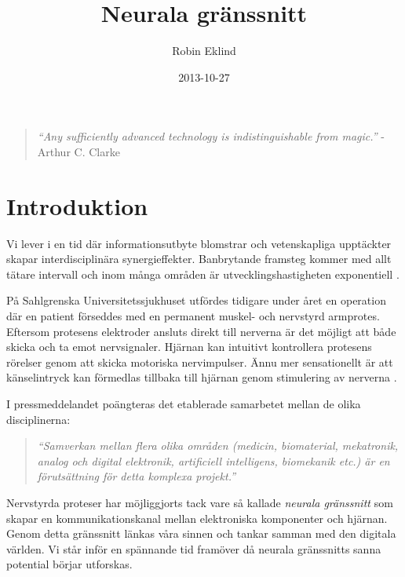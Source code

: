 \documentclass[12pt, a4paper]{article}
\title{Neurala gränssnitt}
\author{Robin Eklind}
\date{2013-10-27}
\begin{document}
\maketitle

\vfill

\begin{quote}
	\textit{``Any sufficiently advanced technology is indistinguishable from magic.''} - \\ Arthur C. Clarke \cite{clarke_quote}
\end{quote}

\pagebreak

\tableofcontents

\pagebreak


\section{Introduktion}

Vi lever i en tid där informationsutbyte blomstrar och vetenskapliga upptäckter skapar interdisciplinära synergieffekter. Banbrytande framsteg kommer med allt tätare intervall och inom många områden är utvecklingshastigheten exponentiell \cite{exponential}.

På Sahlgrenska Universitetssjukhuset utfördes tidigare under året en operation där en patient förseddes med en permanent muskel- och nervstyrd armprotes. Eftersom protesens elektroder ansluts direkt till nerverna är det möjligt att både skicka och ta emot nervsignaler. Hjärnan kan intuitivt kontrollera protesens rörelser genom att skicka motoriska nervimpulser. Ännu mer sensationellt är att känselintryck kan förmedlas tillbaka till hjärnan genom stimulering av nerverna \cite{prosthetic_operation}.

I pressmeddelandet poängteras det etablerade samarbetet mellan de olika disciplinerna:
\begin{quote}
	\textit{``Samverkan mellan flera olika områden (medicin, biomaterial, mekatronik, analog och digital elektronik, artificiell intelligens, biomekanik etc.) är en förutsättning för detta komplexa projekt.''} \cite{prosthetic_operation}
\end{quote}

Nervstyrda proteser har möjliggjorts tack vare så kallade \textit{neurala gränssnitt} som skapar en kommunikationskanal mellan elektroniska komponenter och hjärnan. Genom detta gränssnitt länkas våra sinnen och tankar samman med den digitala världen. Vi står inför en spännande tid framöver då neurala gränssnitts sanna potential börjar utforskas.
\end{document}
